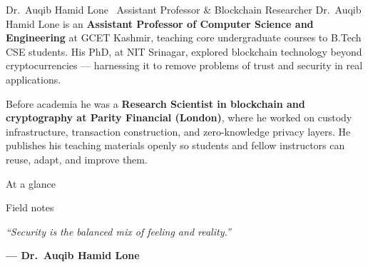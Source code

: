 

\begin{fmbox}{Dr.\ Auqib Hamid Lone \textemdash\ Assistant Professor \& Blockchain Researcher}
\noindent Dr.\ Auqib Hamid Lone is an \textbf{Assistant Professor of Computer
Science and Engineering} at GCET Kashmir, teaching core undergraduate courses to
B.Tech CSE students. His PhD, at NIT Srinagar, explored blockchain technology
beyond cryptocurrencies --- harnessing it to remove problems of trust and security
in real applications.

\medskip
Before academia he was a \textbf{Research Scientist in blockchain and
cryptography at Parity Financial (London)}, where he worked on custody
infrastructure, transaction construction, and zero-knowledge privacy layers. He
publishes his teaching materials openly so students and fellow instructors can
reuse, adapt, and improve them.
\end{fmbox}

\vspace{0.7em}
\begin{goldbox}{At a glance}
\noindent{}\\[0.5em]
\end{goldbox}

\vspace{0.7em}
\begin{fmbox}{Field notes}
\end{fmbox}

\vspace{0.7em}
\begin{tcolorbox}[enhanced, breakable, colback=bookteal, colframe=booktealdark,
    boxrule=0.6pt, arc=2pt, left=10pt, right=10pt, top=9pt, bottom=9pt]
{\itshape\color{white}\large ``Security is the balanced mix of feeling and reality.''\par}
\vspace{0.35em}
{\sffamily\bfseries\color{bookgold}\small --- Dr.\ Auqib Hamid Lone\par}
\end{tcolorbox}

